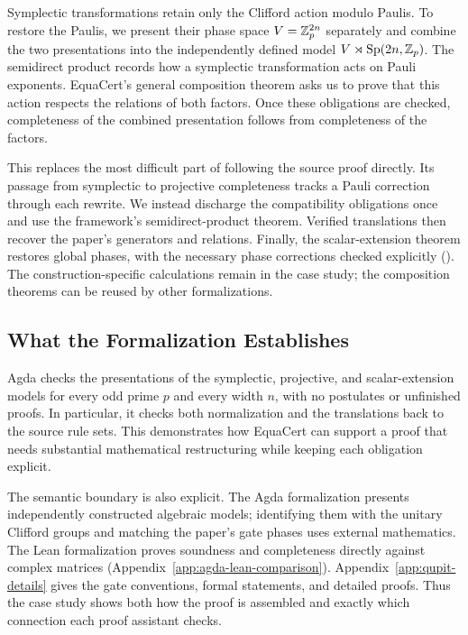 \documentclass[acmsmall,screen,nonacm]{acmart}
\begin{document}
Symplectic transformations retain only the Clifford action modulo Paulis. To restore the Paulis, we present their phase space $V=\mathbb{Z}_p^{2n}$ separately and combine the two presentations into the independently defined model $V\rtimes\mathrm{Sp}(2n,\mathbb{Z}_p)$. The semidirect product records how a symplectic transformation acts on Pauli exponents. EquaCert's general composition theorem asks us to prove that this action respects the relations of both factors. Once these obligations are checked, completeness of the combined presentation follows from completeness of the factors.

This replaces the most difficult part of following the source proof directly. Its passage from symplectic to projective completeness tracks a Pauli correction through each rewrite. We instead discharge the compatibility obligations once and use the framework's semidirect-product theorem. Verified translations then recover the paper's generators and relations. Finally, the scalar-extension theorem restores global phases, with the necessary phase corrections checked explicitly (). The construction-specific calculations remain in the case study; the composition theorems can be reused by other formalizations.



\subsection{What the Formalization Establishes}\label{sec:q-discussion}

Agda checks the presentations of the symplectic, projective, and scalar-extension models for every odd prime $p$ and every width $n$, with no postulates or unfinished proofs. In particular, it checks both normalization and the translations back to the source rule sets. This demonstrates how EquaCert can support a proof that needs substantial mathematical restructuring while keeping each obligation explicit.

The semantic boundary is also explicit. The Agda formalization presents independently constructed algebraic models; identifying them with the unitary Clifford groups and matching the paper's gate phases uses external mathematics. The Lean formalization proves soundness and completeness directly against complex matrices (Appendix~\ref{app:agda-lean-comparison}). Appendix~\ref{app:qupit-details} gives the gate conventions, formal statements, and detailed proofs. Thus the case study shows both how the proof is assembled and exactly which connection each proof assistant checks.
\end{document}
